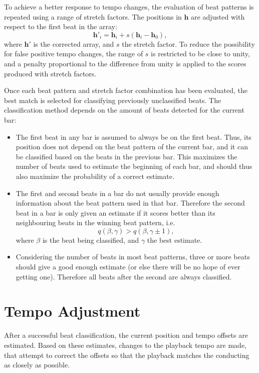 To achieve a better response to tempo changes,
the evaluation of beat patterns is repeated
using a range of stretch factors.
The positions in $\mathbf{h}$ are
adjusted with respect to the first beat in the array:
\begin{equation}
\mathbf{h}'_i = \mathbf{h}_i + s(\mathbf{h}_i - \mathbf{h}_0),
\end{equation}
where $\mathbf{h}'$ is the corrected array,
and $s$ the stretch factor.
To reduce the possibility for false positive tempo changes,
the range of $s$ is restricted to be close to unity,
and a penalty proportional to the difference from unity
is applied to the scores produced with stretch factors.

Once each beat pattern and stretch factor combination
has been evaluated,
the best match is selected for classifying previously unclassified beats.
The classification method depends on
the amount of beats detected for the current bar:
\begin{itemize}
\item The first beat in any bar is assumed to always be on the first beat.
Thus, its position does not depend on the beat pattern of the current bar,
and it can be classified based on the beats in the previous bar.
This maximizes the number of beats used
to estimate the beginning of each bar,
and should thus also maximize the probability of a correct estimate.
\item The first and second beats in a bar do not usually
provide enough information about the beat pattern used in that bar.
Therefore the second beat in a bar is only given an estimate if
it scores better than its neighbouring beats in the winning beat pattern,
i.e.
\begin{equation}
q(\beta,\gamma) > q(\beta, \gamma \pm 1),
\end{equation}
where $\beta$ is the beat being classified,
and $\gamma$ the best estimate.
\item Considering the number of beats in most beat patterns,
three or more beats should give a good enough estimate
(or else there will be no hope of ever getting one).
Therefore all beats after the second are always classified.
\end{itemize}

\section{Tempo Adjustment}
\label{sec:tempo_adjustment}

After a successful beat classification,
the current position and tempo offsets
are estimated.
Based on these estimates,
changes to the playback tempo are made,
that attempt to correct the offsets
so that the playback matches the conducting
as closely as possible.

